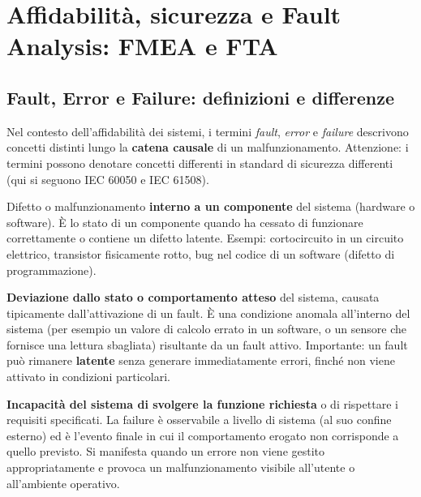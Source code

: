 \chapter{Affidabilità, sicurezza e Fault Analysis: FMEA e FTA}
\label{cap:fault-analysis}

\section{Fault, Error e Failure: definizioni e differenze}
Nel contesto dell'affidabilità dei sistemi, i termini \emph{fault}, \emph{error} e \emph{failure} descrivono concetti distinti lungo la \textbf{catena causale} di un malfunzionamento. Attenzione: i termini possono denotare concetti differenti in standard di sicurezza differenti (qui si seguono IEC 60050 e IEC 61508).

\begin{defn}
Difetto o malfunzionamento \textbf{interno a un componente} del sistema (hardware o software). È lo stato di un componente quando ha cessato di funzionare correttamente o contiene un difetto latente. Esempi: cortocircuito in un circuito elettrico, transistor fisicamente rotto, bug nel codice di un software (difetto di programmazione).
\end{defn}

\begin{defn}
\textbf{Deviazione dallo stato o comportamento atteso} del sistema, causata tipicamente dall'attivazione di un fault. È una condizione anomala all'interno del sistema (per esempio un valore di calcolo errato in un software, o un sensore che fornisce una lettura sbagliata) risultante da un fault attivo. Importante: un fault può rimanere \textbf{latente} senza generare immediatamente errori, finché non viene attivato in condizioni particolari.
\end{defn}

\begin{defn}
\textbf{Incapacità del sistema di svolgere la funzione richiesta} o di rispettare i requisiti specificati. La failure è osservabile a livello di sistema (al suo confine esterno) ed è l'evento finale in cui il comportamento erogato non corrisponde a quello previsto. Si manifesta quando un errore non viene gestito appropriatamente e provoca un malfunzionamento visibile all'utente o all'ambiente operativo.
\end{defn}


